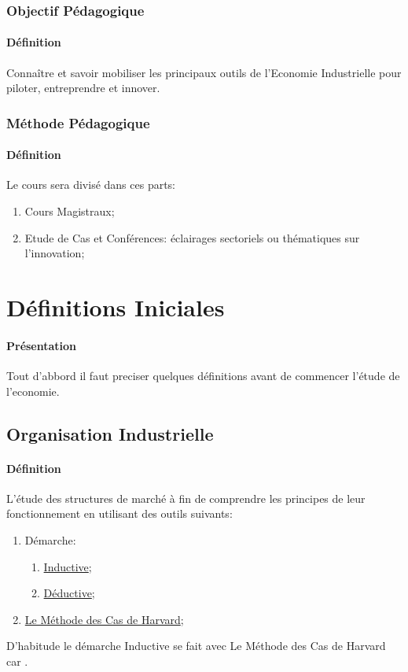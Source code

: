 \documentclass{article}
\begin{document}
\subsubsection{Objectif Pédagogique}
\paragraph{Définition}Connaître et savoir mobiliser les principaux outils de l'Economie Industrielle pour piloter, entreprendre et innover.

\subsubsection{Méthode Pédagogique}
\paragraph{Définition}Le cours sera divisé dans ces parts:
\begin{enumerate}[noitemsep]
    \item Cours Magistraux;
    \item Etude de Cas et Conférences: éclairages sectoriels ou thématiques sur l'innovation;
\end{enumerate}


\section{Définitions Iniciales}
\paragraph{Présentation}Tout d'abbord il faut preciser quelques définitions avant de commencer l'étude de l'economie.

\subsection{Organisation Industrielle}
\paragraph{Définition}L'étude des structures de marché à fin de comprendre les principes de leur fonctionnement en utilisant des outils suivants:
\begin{enumerate}
    \item Démarche:
    \begin{enumerate}[noitemsep]
        \item \href{https://fr.wikipedia.org/wiki/Induction_(logique)}{Inductive};

        \item \href{https://fr.wikipedia.org/wiki/M%C3%A9thode_hypoth%C3%A9tico-d%C3%A9ductive}{Déductive};
    \end{enumerate}

    \item \href{https://fr.wikipedia.org/wiki/M%C3%A9thode_des_cas}{Le Méthode des Cas de Harvard};
\end{enumerate}
D'habitude le démarche Inductive se fait avec Le Méthode des Cas de Harvard car .\\
\end{document}
